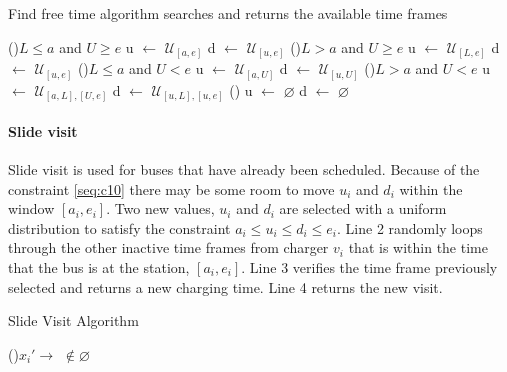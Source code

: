 \documentclass[11pt,a4paper,final]{article}
\newcommand{\I}{\mathbb{I}}                 %
\newcommand{\C}{\mathbb{C}}                 %
\newcommand{\U}{\mathcal{U}}                %
\newcommand{\Sol}{\mathbb{S}}               %
\begin{document}
\begin{algorithm}[H]
\caption{Find free time algorithm searches and returns the available time frames}
    \LinesNumbered

    \Begin
    {
        \If(\tcc*[f]{If $L < a < e < U]$ (\autoref{subfig:sandwich})}){$L \leq a$ and $U \geq e$}
        {
                u $\leftarrow$ $\U_{[a,e]}$\;
                d $\leftarrow$ $\U_{[u,e]}$\;
        }
        \ElseIf(){$L > a$ and $U \geq e$}
        {
                u $\leftarrow$ $\U_{[L,e]}$\;
                d $\leftarrow$ $\U_{[u,e]}$\;
        }
        \ElseIf(){$L \leq a$ and $U < e$}
        {
                u $\leftarrow$ $\U_{[a,U]}$\;
                d $\leftarrow$ $\U_{[u,U]}$\;
        }
        \ElseIf(){$L > a$ and $U < e$}
        {
                u $\leftarrow$ $\U_{[a,L], [U,e]}$\;
                d $\leftarrow$ $\U_{[u,L], [u,e]}$\;
        }
        \Else()
        {
                u $\leftarrow$ $\varnothing$\;
                d $\leftarrow$ $\varnothing$\;
        }

    }
\label{alg:find-free-time}
\end{algorithm}

\paragraph{Slide visit}
\label{slide-visit}
Slide visit is used for buses that have already been scheduled. Because of the constraint \ref{seq:c10} there may be
some room to move \(u_i\) and \(d_i\) within the window \([a_i, e_i]\). Two new values, \(u_i\) and \(d_i\) are selected with a
uniform distribution to satisfy the constraint \(a_i \leq u_i \leq d_i \leq e_i\). Line 2 randomly loops through the other
inactive time frames from charger \(v_i\) that is within the time that the bus is at the station, \([a_i, e_i]\). Line 3
verifies the time frame previously selected and returns a new charging time. Line 4 returns the new visit.

\begin{algorithm}[H]
\caption{Slide Visit Algorithm}
    \LinesNumbered
    \KwIn{$\Sol$}
    \KwOut{$\I_i'$}

    \Begin
    {
        \While {$C_q^j \in \{[a_i, e_i]\} \subset \U_{\C_{v_i}}$}
        {
            \If(){$x_i' \rightarrow$  $\not\in \varnothing$}
            {
                \Return{$\I_i \leftarrow x_i'$} 
            }
        }
    }
\label{alg:slide-visit}
\end{algorithm}
\end{document}
